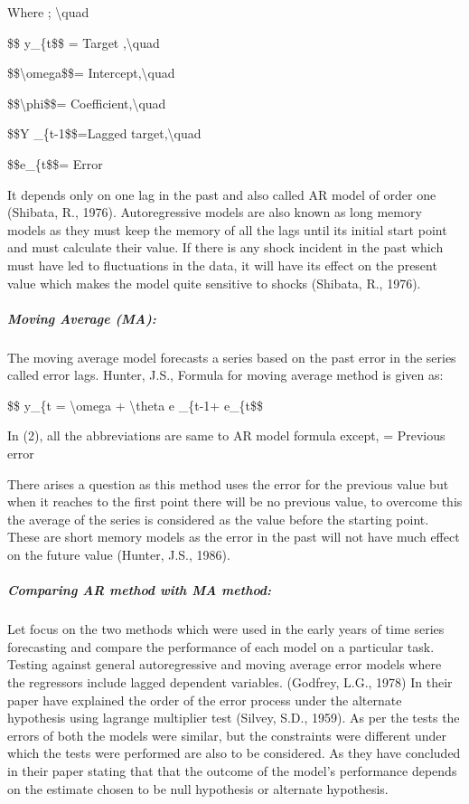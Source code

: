 \documentclass[
  letterpaper,
  DIV=11,
  numbers=noendperiod]{scrartcl}
\let\oldsubparagraph\subparagraph
\renewcommand{\subparagraph}[1]{\oldsubparagraph{#1}\mbox{}}
\begin{document}
Where ; \textbackslash quad

\$\$ y\_\{t\$\$ = Target ,\textbackslash quad

\$\$\textbackslash omega\$\$= Intercept,\textbackslash quad

\$\$\textbackslash phi\$\$= Coefficient,\textbackslash quad

\$\$Y \_\{t-1\$\$=Lagged target,\textbackslash quad

\$\$e\_\{t\$\$= Error

It depends only on one lag in the past and also called AR model of order
one (Shibata, R., 1976). Autoregressive models are also known as long
memory models as they must keep the memory of all the lags until its
initial start point and must calculate their value. If there is any
shock incident in the past which must have led to fluctuations in the
data, it will have its effect on the present value which makes the model
quite sensitive to shocks (Shibata, R., 1976).

\hypertarget{moving-average-ma}{%
\subparagraph{\texorpdfstring{\textbf{Moving Average
(MA):}}{Moving Average (MA):}}\label{moving-average-ma}}

The moving average model forecasts a series based on the past error in
the series called error lags. Hunter, J.S., Formula for moving average
method is given as:

\$\$ y\_\{t = \textbackslash omega + \textbackslash theta e \_\{t-1+
e\_\{t\$\$

In (2), all the abbreviations are same to AR model formula except, =
Previous error

There arises a question as this method uses the error for the previous
value but when it reaches to the first point there will be no previous
value, to overcome this the average of the series is considered as the
value before the starting point. These are short memory models as the
error in the past will not have much effect on the future value (Hunter,
J.S., 1986).

\hypertarget{comparing-ar-method-with-ma-method}{%
\subparagraph{\texorpdfstring{\textbf{Comparing AR method with MA
method:}}{Comparing AR method with MA method:}}\label{comparing-ar-method-with-ma-method}}

Let focus on the two methods which were used in the early years of time
series forecasting and compare the performance of each model on a
particular task. Testing against general autoregressive and moving
average error models where the regressors include lagged dependent
variables. (Godfrey, L.G., 1978) In their paper have explained the order
of the error process under the alternate hypothesis using lagrange
multiplier test (Silvey, S.D., 1959). As per the tests the errors of
both the models were similar, but the constraints were different under
which the tests were performed are also to be considered. As they have
concluded in their paper stating that that the outcome of the model's
performance depends on the estimate chosen to be null hypothesis or
alternate hypothesis.
\end{document}
